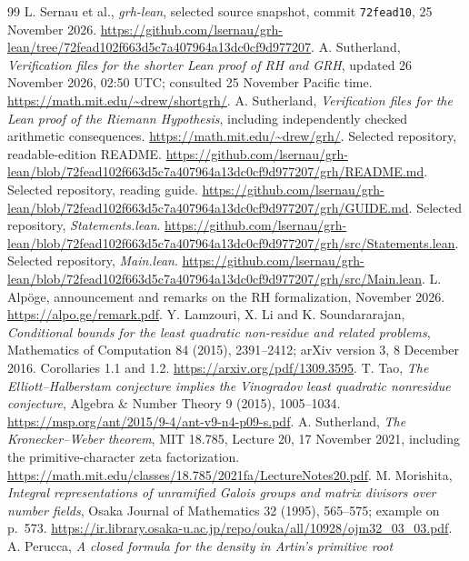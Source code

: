 \documentclass[11pt,letterpaper]{article}
\theoremstyle{definition}\newtheorem{definition}[theorem]{Definition}
\theoremstyle{remark}\newtheorem{remark}[theorem]{Remark}
\begin{document}
\clearpage
\begin{thebibliography}{99}\small
{} L. Sernau et al., \emph{grh-lean}, selected source snapshot,
commit \texttt{72fead10}, 25 November 2026.
\url{https://github.com/lsernau/grh-lean/tree/72fead102f663d5c7a407964a13dc0cf9d977207}.
 A. Sutherland, \emph{Verification files for the shorter Lean proof of RH and GRH},
updated 26 November 2026, 02:50 UTC; consulted 25 November Pacific time.
\url{https://math.mit.edu/~drew/shortgrh/}.
 A. Sutherland, \emph{Verification files for the Lean proof of the Riemann Hypothesis},
including independently checked arithmetic consequences.
\url{https://math.mit.edu/~drew/grh/}.
 Selected repository, readable-edition README.
\url{https://github.com/lsernau/grh-lean/blob/72fead102f663d5c7a407964a13dc0cf9d977207/grh/README.md}.
 Selected repository, reading guide.
\url{https://github.com/lsernau/grh-lean/blob/72fead102f663d5c7a407964a13dc0cf9d977207/grh/GUIDE.md}.
 Selected repository, \emph{Statements.lean}.
\url{https://github.com/lsernau/grh-lean/blob/72fead102f663d5c7a407964a13dc0cf9d977207/grh/src/Statements.lean}.
 Selected repository, \emph{Main.lean}.
\url{https://github.com/lsernau/grh-lean/blob/72fead102f663d5c7a407964a13dc0cf9d977207/grh/src/Main.lean}.
 L. Alp\"oge, announcement and remarks on the RH formalization, November 2026.
\url{https://alpo.ge/remark.pdf}.
 Y. Lamzouri, X. Li and K. Soundararajan, \emph{Conditional bounds for the least
quadratic non-residue and related problems}, Mathematics of Computation 84 (2015), 2391--2412;
arXiv version 3, 8 December 2016. Corollaries 1.1 and 1.2.
\url{https://arxiv.org/pdf/1309.3595}.
 T. Tao, \emph{The Elliott--Halberstam conjecture implies the Vinogradov least quadratic
nonresidue conjecture}, Algebra \& Number Theory 9 (2015), 1005--1034.
\url{https://msp.org/ant/2015/9-4/ant-v9-n4-p09-s.pdf}.
 A. Sutherland, \emph{The Kronecker--Weber theorem}, MIT 18.785, Lecture 20,
17 November 2021, including the primitive-character zeta factorization.
\url{https://math.mit.edu/classes/18.785/2021fa/LectureNotes20.pdf}.
 M. Morishita, \emph{Integral representations of unramified Galois groups and matrix
divisors over number fields}, Osaka Journal of Mathematics 32 (1995), 565--575; example on p.~573.
\url{https://ir.library.osaka-u.ac.jp/repo/ouka/all/10928/ojm32_03_03.pdf}.
 A. Perucca, \emph{A closed formula for the density in Artin's primitive root
}
\end{thebibliography}
\end{document}
